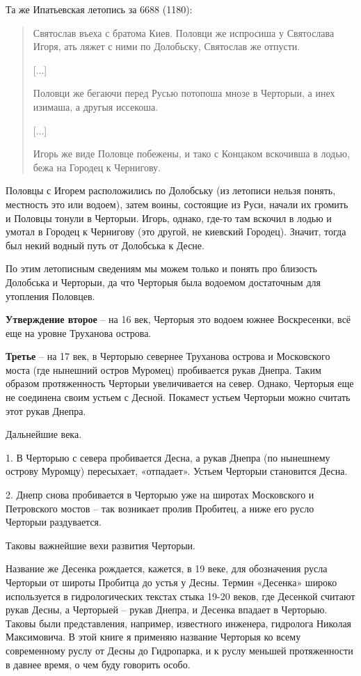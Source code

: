 Та же Ипатьевская летопись за 6688 (1180):

\begin{quotation}
Святослав въеха с братома  Киев. Половци же испросиша у Святослава Игоря, ать ляжет с ними по Долобьску, Святослав же отпусти.

[...]

Половци же бегаючи перед Русью потопоша мнозе в Черторыи, а инех изимаша, а другыя иссекоша.

[...]

Игорь же виде Половце побежены, и тако с Концаком вскочивша в лодью, бежа на Городец к Чернигову.\end{quotation}

Половцы с Игорем расположились по Долобську (из летописи нельзя понять, местность это или водоем), затем воины, состоящие из Руси, начали их громить и Половцы тонули в Черторыи. Игорь, однако, где-то там вскочил в лодью и умотал в Городец к Чернигову (это другой, не киевский Городец). Значит, тогда был некий водный путь от Долобська к Десне.

По этим летописным сведениям мы можем только и понять про близость Долобська и Черторыи, да что Черторыя была водоемом достаточным для утопления Половцев. %

\textbf{Утверждение второе} – на 16 век, Черторыя это водоем южнее Воскресенки, всё еще на уровне Труханова острова.

\textbf{Третье} – на 17 век, в Черторыю севернее Труханова острова и Московского моста (где нынешний остров Муромец) пробивается рукав Днепра. Таким образом протяженность Черторыи увеличивается на север. Однако, Черторыя еще не соединена своим устьем с Десной. Покамест устьем Черторыи можно считать этот рукав Днепра.

Дальнейшие века.

1. В Черторыю с севера пробивается Десна, а рукав Днепра (по нынешнему острову Муромцу) пересыхает, «отпадает». Устьем Черторыи становится Десна.

2. Днепр снова пробивается в Черторыю уже на широтах Московского и Петровского мостов – так возникает пролив Пробитец, а ниже его русло Черторыи раздувается.

Таковы важнейшие вехи развития Черторыи.

Название же Десенка рождается, кажется, в 19 веке, для обозначения русла Черторыи от широты Пробитца до устья у Десны. Термин «Десенка» широко используется в гидрологических текстах стыка 19-20 веков, где Десенкой считают рукав Десны, а Черторыей – рукав Днепра, и Десенка впадает в Черторыю. Таковы были представления, например, известного инженера, гидролога Николая Максимовича. В этой книге я применяю название Черторыя ко всему современному руслу от Десны до Гидропарка, и к руслу меньшей протяженности в давнее время, о чем буду говорить особо.

